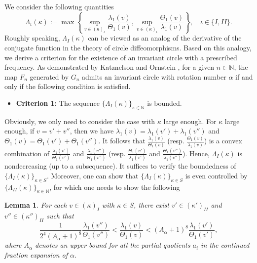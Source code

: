 \documentclass{amsart}
\newcounter{item}[section]
\newtheorem{Lemma}[Definition]{Lemma}
\theoremstyle{definition}
\begin{document}
We consider the following quantities
\[\Lambda_\iota(\kappa):=\max\left\{\sup_{v\in (\kappa)_\iota}\frac{\lambda_1(v)}{\Theta_1(v)},\sup_{v\in (\kappa)_\iota}\frac{\Theta_1(v)}{\lambda_1(v)}\right\},\quad \iota\in \{I,II\}.\]
Roughly speaking, $\Lambda_I(\kappa)$ can be viewed as an analog of the derivative of the conjugate function in the theory of circle diffeomorphisms. Based on this analogy, we derive a criterion for the existence of an invariant circle with a prescribed frequency. As demonstrated by Katznelson and Ornstein \cite{KO1}, for a given $n \in \mathbb{N}$, the map $F_n$ generated by $G_n$ admits an invariant circle with rotation number $\alpha$ if and only if the following condition is satisfied.
\begin{itemize}
	\item {\bf Criterion 1:}    The sequence $\{\Lambda_I(\kappa)\}_{\kappa\in \mathbb{N}}$ is  bounded.
\end{itemize}
Obviously, we only need to consider the case with $\kappa$ large enough. For $\kappa$ large enough,  if $v=v'+v''$, then we have $\lambda_1(v)=\lambda_1(v')+\lambda_1(v'')$ and $\Theta_1(v)=\Theta_1(v')+\Theta_1(v'')$. It follows that $\frac{\lambda_1(v)}{\Theta_1(v)}$ (resp. $\frac{\Theta_1(v)}{\lambda_1(v)}$) is a convex combination of $\frac{\lambda_1(v')}{\Theta_1(v')}$ and $\frac{\lambda_1(v'')}{\Theta_1(v'')}$ (resp. $\frac{\Theta_1(v')}{\lambda_1(v')}$ and $\frac{\Theta_1(v'')}{\lambda_1(v'')}$). Hence, $\Lambda_I(\kappa)$ is nondecreasing (up to a subsequence). It suffices to verify the boundedness of $\{\Lambda_{I}(\kappa)\}_{\kappa\in S}$. Moreover, one can show that $\{\Lambda_I(\kappa)\}_{\kappa\in S}$ is even controlled by $\{\Lambda_{II}(\kappa)\}_{\kappa\in \mathbb{N}}$, for which one needs to show the following
\begin{Lemma}\label{3lam}
For each \( v \in (\kappa)_{I} \) with \( \kappa \in S \), there exist \( v' \in (\kappa')_{II} \) and \( v'' \in (\kappa'')_{II} \) such that
\[
\frac{1}{2^4 (A_\alpha + 1)^8} \frac{\lambda_1(v'')}{\Theta_1(v'')}
< \frac{\lambda_1(v)}{\Theta_1(v)}
< (A_\alpha + 1)^8  \frac{\lambda_1(v')}{\Theta_1(v')},
\]
where \( A_\alpha \) denotes an upper bound for all the partial quotients \( a_i \) in the continued fraction expansion of \( \alpha \).
\end{Lemma}
\end{document}
